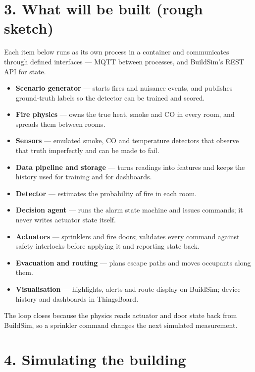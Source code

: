 \section{3. What will be built (rough sketch)}

Each item below runs as its own process in a container and communicates through
defined interfaces --- MQTT between processes, and BuildSim's REST API for state.

\begin{itemize}[leftmargin=1.4em, itemsep=1pt]
  \item \textbf{Scenario generator} --- starts fires and nuisance events, and
        publishes ground-truth labels so the detector can be trained and scored.
  \item \textbf{Fire physics} --- owns the true heat, smoke and CO in every room,
        and spreads them between rooms.
  \item \textbf{Sensors} --- emulated smoke, CO and temperature detectors that
        observe that truth imperfectly and can be made to fail.
  \item \textbf{Data pipeline and storage} --- turns readings into features and
        keeps the history used for training and for dashboards.
  \item \textbf{Detector} --- estimates the probability of fire in each room.
  \item \textbf{Decision agent} --- runs the alarm state machine and issues
        commands; it never writes actuator state itself.
  \item \textbf{Actuators} --- sprinklers and fire doors; validates every command
        against safety interlocks before applying it and reporting state back.
  \item \textbf{Evacuation and routing} --- plans escape paths and moves occupants
        along them.
  \item \textbf{Visualisation} --- highlights, alerts and route display on
        BuildSim; device history and dashboards in ThingsBoard.
\end{itemize}

The loop closes because the physics reads actuator and door state back from
BuildSim, so a sprinkler command changes the next simulated measurement.

\section{4. Simulating the building}

